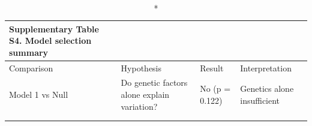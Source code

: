 \begin{longtable}{llll}
\caption*{
{\large Supplementary Table S4. Model selection summary}
} \\ 
\toprule
Comparison & Hypothesis & Result & Interpretation \\ 
\midrule\addlinespace[2.5pt]
Model 1 vs Null & Do genetic factors alone explain variation? & No (p = 0.122) & Genetics alone insufficient \\ 
\cellcolor[HTML]{E8F5E9}{Model 2 vs Model 1} & \cellcolor[HTML]{E8F5E9}{Do sex and infection explain variation?} & \cellcolor[HTML]{E8F5E9}{Yes - Infection matters (p < 0.001)} & \cellcolor[HTML]{E8F5E9}{Infection is primary driver} \\ 
\cellcolor[HTML]{E8F5E9}{Model 3 vs Model 2} & \cellcolor[HTML]{E8F5E9}{Do interactions improve the model?} & \cellcolor[HTML]{E8F5E9}{Yes - Sex × HI interaction (p = 0.011)} & \cellcolor[HTML]{E8F5E9}{Males specifically affected by ancestry} \\ 
\bottomrule
\end{longtable}

